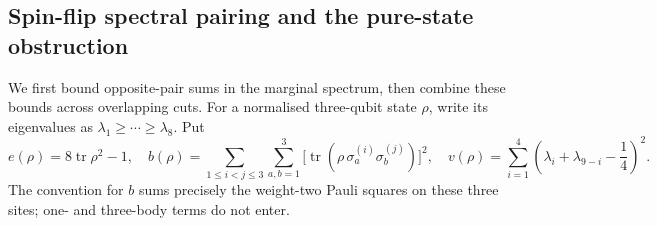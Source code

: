\subsection{Spin-flip spectral pairing and the pure-state obstruction}
\label{sec:seven-spinflip-spectral}

We first bound opposite-pair sums in the marginal spectrum, then combine these bounds across overlapping cuts.
For a normalised three-qubit state \(\rho\), write its
eigenvalues as \(\lambda_1\ge\cdots\ge\lambda_8\).
Put
\[
 e(\rho)=8\operatorname{tr}\rho^2-1,\quad
 b(\rho)=\sum_{1\le i<j\le3}\sum_{a,b=1}^3
    \bigl[\operatorname{tr}(\rho\,\sigma_a^{(i)}
                       \sigma_b^{(j)})\bigr]^2,\quad
 v(\rho)=\sum_{i=1}^4
   \left(\lambda_i+\lambda_{9-i}-\frac14\right)^2.
\]
The convention for \(b\) sums precisely the
weight-two Pauli squares on these three sites;
one- and three-body terms do not enter.

